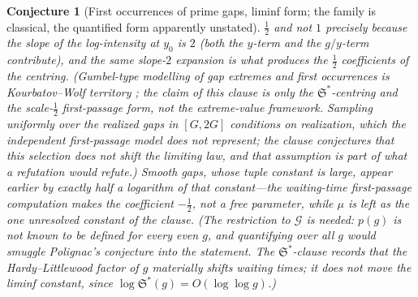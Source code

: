 \documentclass[11pt]{article}
\newtheorem{conjecture}{Conjecture}
\theoremstyle{definition}
\newcommand{\SG}{\mathfrak S}
\begin{document}
\begin{conjecture}[First occurrences of prime gaps, liminf form; the
family is classical, the quantified form apparently
unstated]
$\tfrac12$ and not $1$ precisely because the slope of the
log-intensity at $y_0$ is $2$ (both the $y$-term and the $g/y$-term
contribute), and the same slope-$2$ expansion is what produces the
$\tfrac12$ coefficients of the centring.  (Gumbel-type modelling of gap
extremes and first occurrences is Kourbatov--Wolf territory
\cite{Kourbatov,KW2020}; the claim of this clause is only the
$\SG^{*}$-centring and the scale-$\tfrac12$ first-passage form,
not the extreme-value framework.  Sampling uniformly
over the \emph{realized}
gaps in
$[G,2G]$ conditions on realization, which the independent
first-passage model does not represent; the clause conjectures that
this selection does not shift the limiting law, and that assumption
is part of what a refutation would refute.)  Smooth
gaps, whose tuple constant is large, appear \emph{earlier} by exactly
half a logarithm of that constant---the waiting-time first-passage
computation makes the coefficient $-\tfrac12$, not a free parameter,
while $\mu$ is left as the one unresolved constant of the clause.  (The
restriction to $\mathcal G$ is needed: $p(g)$ is not known
to be defined for every even $g$, and quantifying over all $g$ would
smuggle Polignac's conjecture into the statement.  The
$\SG^{*}$-clause records that the Hardy--Littlewood factor of $g$
materially shifts waiting times; it does not move the liminf constant,
since $\log\SG^{*}(g)=O(\log\log g)$.)
\end{conjecture}
\end{document}
